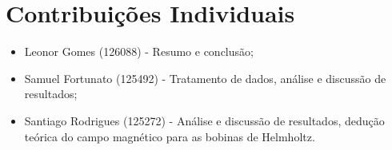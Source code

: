 \section{Contribuições Individuais}

\begin{itemize}
	\item Leonor Gomes (126088) - Resumo e conclusão;
	\item Samuel Fortunato (125492) - Tratamento de dados, análise e discussão de resultados;
	\item Santiago Rodrigues (125272) - Análise e discussão de resultados, dedução teórica do campo magnético para as bobinas de Helmholtz.
\end{itemize}
